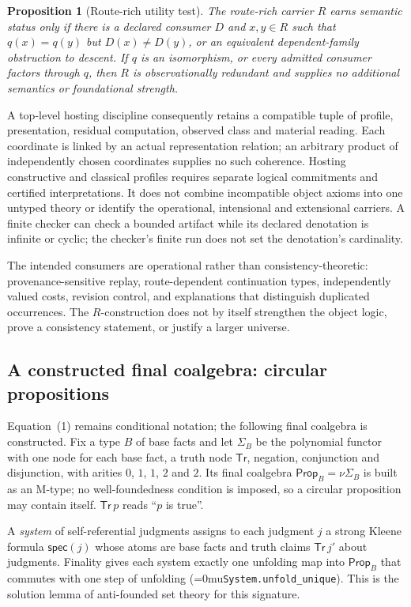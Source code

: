 \documentclass[11pt]{article}
\newcommand{\leanname}[1]{\textup{\Urlmuskip=0mu\relax\nolinkurl{#1}}}
\newtheorem{proposition}[theorem]{Proposition}
\theoremstyle{definition}
\theoremstyle{remark}
\begin{document}
\begin{proposition}[Route-rich utility test]
The route-rich carrier $R$ earns semantic status only if there is a declared
consumer $D$ and $x,y\in R$ such that $q(x)=q(y)$ but $D(x)\ne D(y)$, or an
equivalent dependent-family obstruction to descent.  If $q$ is an isomorphism, or
every admitted consumer factors through $q$, then $R$ is observationally
redundant and supplies no additional semantics or foundational strength.
\end{proposition}


A top-level hosting discipline consequently retains a compatible tuple of
profile, presentation, residual computation, observed class and material
reading. Each coordinate is linked by an actual representation relation;
an arbitrary product of independently chosen coordinates supplies no such
coherence. Hosting constructive and classical profiles requires separate
logical commitments and certified interpretations. It does not combine
incompatible object axioms into one untyped theory or identify the
operational, intensional and extensional carriers. A finite checker can
check a bounded artifact while its declared denotation is infinite or
cyclic; the checker's finite run does not set the denotation's cardinality.

The intended consumers are operational rather than consistency-theoretic:
provenance-sensitive replay, route-dependent continuation types, independently
valued costs, revision control, and explanations that distinguish duplicated
occurrences.  The $R$-construction does not by itself strengthen the object
logic, prove a consistency statement, or justify a larger universe.

\subsection{A constructed final coalgebra: circular propositions}
\label{sec:circular-propositions}

Equation~(1) remains conditional notation; the following final coalgebra is
constructed.  Fix a type $B$ of base facts and let $\Sigma_B$ be the polynomial
functor with one node for each base fact, a truth node $\mathsf{Tr}$, negation,
conjunction and disjunction, with arities $0$, $1$, $1$, $2$ and $2$.  Its final
coalgebra $\mathsf{Prop}_B=\nu\Sigma_B$ is built as an M-type; no
well-foundedness condition is imposed, so a circular proposition may contain
itself.  $\mathsf{Tr}\,p$ reads ``$p$ is true''.

A \emph{system} of self-referential judgments assigns to each judgment $j$ a
strong Kleene formula $\mathsf{spec}(j)$ whose atoms are base facts and truth
claims $\mathsf{Tr}\,j'$ about judgments.  Finality gives each system exactly one
unfolding map into $\mathsf{Prop}_B$ that commutes with one step of unfolding
(\leanname{System.unfold_unique}).  This is the solution lemma of anti-founded
set theory \cite{AczelNonWellFounded} for this signature.
\end{document}
